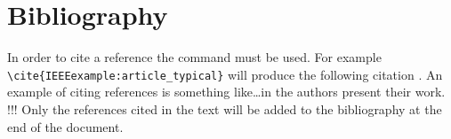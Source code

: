 \section{Bibliography}
In order to cite a reference the  command must be used.
For example \verb?\cite{IEEEexample:article_typical}? will produce the following citation
 \cite{IEEEexample:article_typical}. 
An example of citing references is something like\ldots in \cite{IEEEexample:bluebookbook} \cite{IEEEexample:conf_typical} \cite{IEEEexample:urlsty}
the authors present their work.
!!! Only the references cited in the text will be added to the bibliography at the end of the document.



\normalsize
